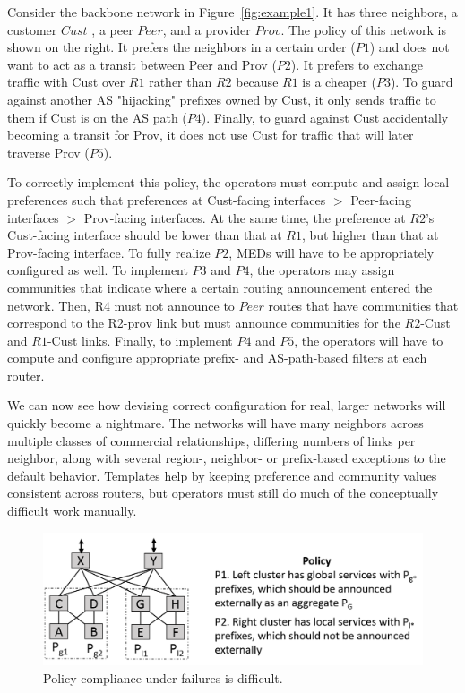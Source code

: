 Consider the backbone network in Figure~\ref{fig:example1}. It has three neighbors, a customer $Cust$ , a peer $Peer$, and a provider $Prov$. The policy of this network is shown on the right. It prefers the neighbors in a certain order ($P1$) and does not want to act as a transit between Peer and Prov ($P2$). It prefers to exchange traffic with Cust over $R1$ rather than $R2$ because $R1$ is a cheaper ($P3$). To guard against another AS "hijacking" prefixes owned by Cust, it only sends traffic to them if Cust is on the AS path ($P4$). Finally, to guard against Cust accidentally becoming a transit for Prov, it does not use Cust for traffic that will later traverse Prov ($P5$).

To correctly implement this policy, the operators must compute and assign local preferences such that preferences at Cust-facing interfaces $>$ Peer-facing interfaces $>$ Prov-facing interfaces. At the same time, the preference at $R2$'s Cust-facing interface should be lower than that at $R1$, but higher than that at Prov-facing interface. To fully realize $P2$, MEDs will have to be appropriately configured as well. To implement $P3$ and $P4$, the operators may assign communities that indicate where a certain routing announcement entered the network. Then, R4 must not announce to $Peer$ routes that have communities that correspond to the R2-prov link but must announce communities for the $R2$-Cust and $R1$-Cust links. Finally, to implement $P4$ and $P5$, the operators will have to compute and configure appropriate prefix- and AS-path-based filters at each router.

We can now see how devising correct configuration for real, larger networks will quickly become a nightmare. The networks will have many neighbors across multiple classes of commercial relationships, differing numbers of links per neighbor, along with several region-, neighbor- or prefix-based exceptions to the default behavior. Templates help by keeping preference and community values consistent across routers, but operators must still do much of the conceptually difficult work manually.

\begin{figure}[t!]
\centering
\includegraphics[width=\columnwidth]{figures/example2}
\caption{Policy-compliance under failures is difficult.}
\label{fig:example2}
\end{figure}

